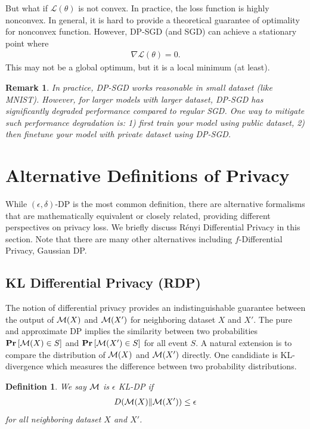\documentclass[11pt, a4paper]{article}
\newtheorem{definition}{Definition}
\newtheorem{remark}{Remark}
\begin{document}
But what if $\mathcal{L}(\theta)$ is not convex.
In practice, the loss function is highly nonconvex.
In general, it is hard to provide a theoretical guarantee of optimality for nonconvex function.
However, DP-SGD (and SGD) can achieve a stationary point where
\begin{align}
    \nabla \mathcal{L}(\theta) = 0.
\end{align}
This may not be a global optimum, but it is a local minimum (at least).

\begin{remark}
    In practice, DP-SGD works reasonable in small dataset (like MNIST).
    However, for larger models with larger dataset, DP-SGD has significantly degraded performance compared to regular SGD.
    One way to mitigate such performance degradation is: 1) first train your model using public dataset, 
    2) then finetune your model with private dataset using DP-SGD.
\end{remark}


\section{Alternative Definitions of Privacy}

While $(\epsilon,\delta)$-DP is the most common definition, there are alternative formalisms 
that are mathematically equivalent or closely related, providing different perspectives on privacy loss.
We briefly discuss Rényi Differential Privacy in this section.
Note that there are many other alternatives including $f$-Differential Privacy, Gaussian DP.


\subsection{KL Differential Privacy (RDP)}
The notion of differential privacy provides an indistinguishable guarantee between the output of ${\cal M}(X)$ and ${\cal M}(X')$
for neighboring dataset $X$ and $X'$.
The pure and approximate DP implies the similarity between two probabilities $\Prob{\cM(X)\in S}$ and $\Prob{\cM(X')\in S}$
for all event $S$.
A natural extension is to compare the distribution of ${\cal M}(X)$ and ${\cal M}(X')$ directly.
One candidiate is KL-divergence which measures the difference between two probability distributions.
\begin{definition}
    We say ${\cal M}$ is $\epsilon$ KL-DP if
    \begin{align}
        D({\cal M}(X)\|{\cal M}(X'))\leq \epsilon
    \end{align}
    for all neighboring dataset $X$ and $X'$.
\end{definition}
\end{document}
